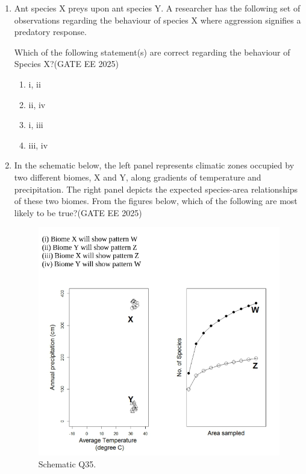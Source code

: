 \begin{enumerate}[leftmargin=*,label=\textbf{Q.\arabic*},resume]
\item Ant species X preys upon ant species Y. A researcher has the following set of observations regarding the behaviour of species X where aggression signifies a predatory response.




Which of the following statement(s) are correct regarding the behaviour of Species X?\hfill {(GATE EE 2025)}
\begin{multicols}{2}
\begin{enumerate}
\item i, ii
\item ii, iv
\item i, iii
\item iii, iv
\end{enumerate}
\end{multicols}

\item In the schematic below, the left panel represents climatic zones occupied by two different biomes, X and Y, along gradients of temperature and precipitation. The right panel depicts the expected species-area relationships of these two biomes. From the figures below, which of the following are most likely to be true?\hfill {(GATE EE 2025)}
\begin{figure}[H]
  \centering
  \includegraphics[width=0.9\columnwidth]{figs/imageQ35.png}
  \caption{Schematic Q35.}
  \label{fig:q35-schematic}
\end{figure}



\end{enumerate}
